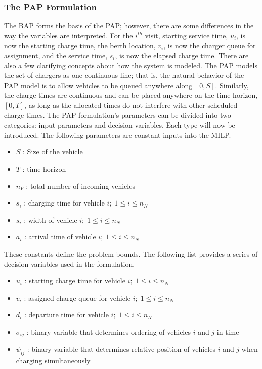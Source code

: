 \documentclass[ee,msthesis]{usuthesis}
\begin{document}
\subsubsection{The PAP Formulation}
\label{sec:input-variables}
The BAP forms the basis of the PAP; however, there are some differences in the way the variables are interpreted. For the
\(i^{th}\) visit, starting service time, \(u_i\), is now the starting charge time, the berth location, \(v_i\), is now the
charger queue for assignment, and the service time, \(s_i\), is now the elapsed charge time. There are also a few clarifying concepts
about how the system is modeled. The PAP models the set of chargers as one continuous line; that is, the natural
behavior of the PAP model is to allow vehicles to be queued anywhere along \([0,S]\). Similarly, the charge times are
continuous and can be placed anywhere on the time horizon, \([0,T]\), as long as the allocated times do not interfere with
other scheduled charge times. The PAP formulation's parameters can be divided into two categories: input parameters and
decision variables. Each type will now be introduced. The following parameters are constant inputs into the MILP.

\begin{itemize}
	\item $S$   : Size of the vehicle
	\item $T$   : time horizon
	\item $n_V$ : total number of incoming vehicles
	\item $s_i$ : charging time for vehicle $i;\; 1 \leq i \leq n_N$
	\item $s_i$ : width of vehicle $i;\; 1 \leq i \leq n_N$
	\item $a_i$ : arrival time of vehicle $i;\; 1 \leq i \leq n_N$
\end{itemize}

These constants define the problem bounds. The following list provides a series of decision variables used in the
formulation.

\begin{itemize}
    \item $u_i$    : starting charge time for vehicle $i;\; 1 \leq i \leq n_N$
    \item $v_i$    : assigned charge queue for vehicle $i;\; 1 \leq i \leq n_N$
    \item $d_i$    : departure time for vehicle $i;\; 1 \leq i \leq n_N$
    \item $\sigma_{ij}$ : binary variable that determines ordering of vehicles $i$ and $j$ in time
    \item $\psi_{ij}$ : binary variable that determines relative position of vehicles $i$ and $j$ when charging simultaneously
\end{itemize}
\end{document}
